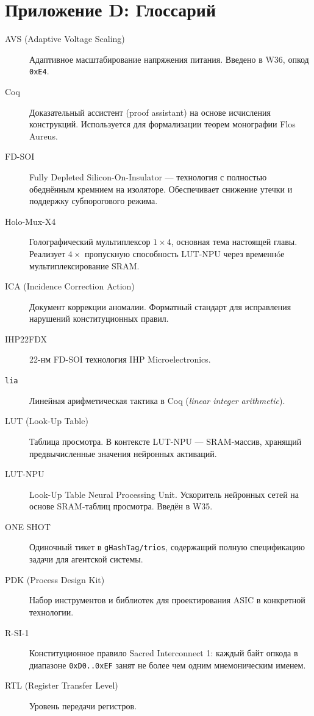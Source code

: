 \section*{Приложение D: Глоссарий}
\label{sec:appendix-glossary}

\begin{description}
  \item[AVS (Adaptive Voltage Scaling)] Адаптивное масштабирование
    напряжения питания. Введено в W36, опкод \texttt{0xE4}.
  \item[Coq] Доказательный ассистент (proof assistant) на основе
    исчисления конструкций. Используется для формализации теорем
    монографии Flos Aureus.
  \item[FD-SOI] Fully Depleted Silicon-On-Insulator — технология
    с полностью обеднённым кремнием на изоляторе. Обеспечивает
    снижение утечки и поддержку субпорогового режима.
  \item[Holo-Mux-X4] Голографический мультиплексор $1\times4$,
    основная тема настоящей главы. Реализует $4\times$ пропускную
    способность LUT-NPU через временнóе мультиплексирование SRAM.
  \item[ICA (Incidence Correction Action)] Документ коррекции аномалии.
    Форматный стандарт для исправления нарушений конституционных правил.
  \item[IHP22FDX] 22-нм FD-SOI технология IHP Microelectronics.
  \item[\texttt{lia}] Линейная арифметическая тактика в Coq
    (\emph{linear integer arithmetic}).
  \item[LUT (Look-Up Table)] Таблица просмотра. В контексте LUT-NPU —
    SRAM-массив, хранящий предвычисленные значения нейронных активаций.
  \item[LUT-NPU] Look-Up Table Neural Processing Unit. Ускоритель
    нейронных сетей на основе SRAM-таблиц просмотра. Введён в W35.
  \item[ONE SHOT] Одиночный тикет в \texttt{gHashTag/trios},
    содержащий полную спецификацию задачи для агентской системы.
  \item[PDK (Process Design Kit)] Набор инструментов и библиотек
    для проектирования ASIC в конкретной технологии.
  \item[R-SI-1] Конституционное правило Sacred Interconnect 1:
    каждый байт опкода в диапазоне \texttt{0xD0..0xEF} занят
    не более чем одним мнемоническим именем.
  \item[RTL (Register Transfer Level)] Уровень передачи регистров.

\end{description}
